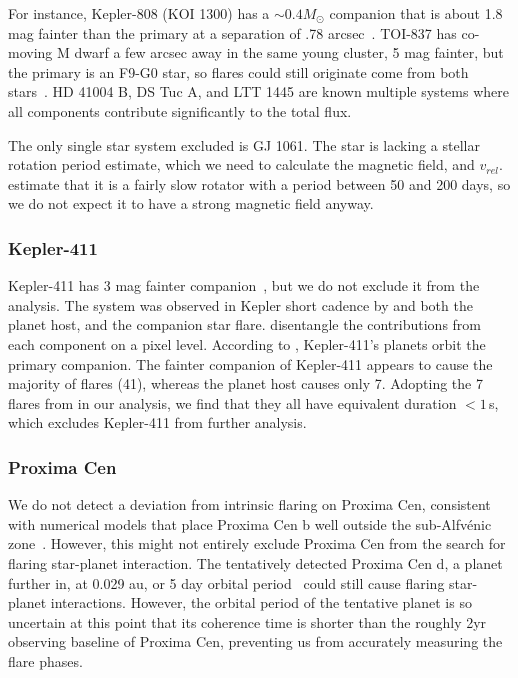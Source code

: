 \documentclass[twocolumn]{aastex631}
\begin{document}
For instance, Kepler-808 (KOI 1300) has a $\sim0.4M_\odot$ \citep{kraus2016impact} companion that is about 1.8 mag fainter than the primary at a separation of .78 arcsec~\citep{baranec2016roboao}. TOI-837 has co-moving M dwarf a few arcsec away in the same young cluster, 5 mag fainter, but the primary is an F9-G0 star, so flares could still originate come from both stars~\citep{bouma2020cluster}. HD 41004 B, DS Tuc A, and LTT 1445 are known multiple systems where all components contribute significantly to the total flux.

The only single star system excluded is GJ 1061. The star is lacking a stellar rotation period estimate, which we need to calculate the magnetic field, and $v_{rel}$. \citet{dreizler2020reddots} estimate that it is a fairly slow rotator with a period between 50 and 200 days, so we do not expect it to have a strong magnetic field anyway.

\subsubsection{Kepler-411}
\label{sec:results:individualstars:kep411}
Kepler-411 has 3 mag fainter companion~\cite{wang2014influence,ziegler2018measuring}, but we do not exclude it from the analysis. The system was observed in Kepler short cadence by \citet{jackman2021stellara} and both the planet host, and the companion star flare. \citet{jackman2021stellara} disentangle the contributions from each component on a pixel level. According to \citet{morton2016false, sun2019kepler411}, Kepler-411's planets orbit the primary companion. The fainter companion of Kepler-411 appears to cause the majority of flares (41), whereas the planet host causes only 7. Adopting the 7 flares from \cite{jackman2021stellara} in our analysis, we find that they all have equivalent duration $<1\,$s, which excludes Kepler-411 from further analysis.

\subsubsection{Proxima Cen}
\label{sec:results:individualstars:proxima}
We do not detect a deviation from intrinsic flaring on Proxima Cen, consistent with numerical models that place Proxima Cen b well outside the sub-Alfv\'enic zone~\citep{kavanagh2021planetinduced}. However, this might not entirely exclude Proxima Cen from the search for flaring star-planet interaction. The tentatively detected Proxima Cen d, a planet further in, at 0.029 au, or 5 day orbital period~\citep{faria2022candidate, artigau2022linebyline} could still cause flaring star-planet interactions. However, the orbital period of the tentative planet is so uncertain at this point that its coherence time is shorter than the roughly 2yr observing baseline of Proxima Cen, preventing us from accurately measuring the flare phases. 
\end{document}
